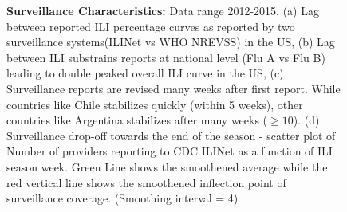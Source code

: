 \documentclass[10pt,letterpaper]{article}
\begin{document}
\begin{figure}[H]
  \centering

  \caption{\textbf{Surveillance Characteristics:} Data range 2012-2015.
  (a)  Lag between reported ILI percentage curves as reported by two 
  surveillance systems(ILINet vs WHO NREVSS) in the US,
  (b)  Lag between ILI substrains reports at national level (Flu A vs Flu B)
  leading to double peaked overall ILI curve in the US,
  (c) Surveillance reports are revised many weeks after first report.
  While countries like Chile stabilizes quickly (within 5 weeks), 
  other countries like Argentina stabilizes after many weeks ($\geq 10$). 
  (d) Surveillance drop-off towards the end of the season - scatter plot of 
  Number of providers reporting to CDC ILINet as a function of ILI season 
  week. Green Line shows the smoothened average while the red vertical
  line shows the smoothened inflection point of surveillance coverage. 
  (Smoothing interval = 4)
  \label{fig1}
  }
\end{figure}
\end{document}
